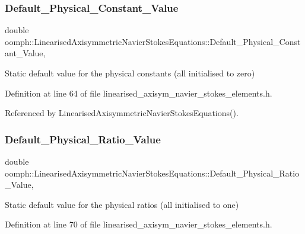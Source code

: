\subsubsection{\texorpdfstring{Default\+\_\+\+Physical\+\_\+\+Constant\+\_\+\+Value}{Default\_Physical\_Constant\_Value}}
{\footnotesize\ttfamily double oomph\+::\+Linearised\+Axisymmetric\+Navier\+Stokes\+Equations\+::\+Default\+\_\+\+Physical\+\_\+\+Constant\+\_\+\+Value\hspace{0.3cm}{\ttfamily [static]}, {\ttfamily [private]}}

Static default value for the physical constants (all initialised to zero) 

Definition at line 64 of file linearised\+\_\+axisym\+\_\+navier\+\_\+stokes\+\_\+elements.\+h.



Referenced by Linearised\+Axisymmetric\+Navier\+Stokes\+Equations().

\mbox{\label{classoomph_1_1LinearisedAxisymmetricNavierStokesEquations_a72cfb6d0e56f55db2d6072a12f5dcff5}} 
\subsubsection{\texorpdfstring{Default\+\_\+\+Physical\+\_\+\+Ratio\+\_\+\+Value}{Default\_Physical\_Ratio\_Value}}
{\footnotesize\ttfamily double oomph\+::\+Linearised\+Axisymmetric\+Navier\+Stokes\+Equations\+::\+Default\+\_\+\+Physical\+\_\+\+Ratio\+\_\+\+Value\hspace{0.3cm}{\ttfamily [static]}, {\ttfamily [private]}}



Static default value for the physical ratios (all initialised to one) 



Definition at line 70 of file linearised\+\_\+axisym\+\_\+navier\+\_\+stokes\+\_\+elements.\+h.



